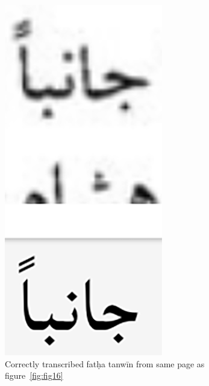 \begin{figure}[h]
	\includegraphics[width=\linewidth]{images/image1.png}
	\caption{Correctly transcribed fatḥa tanwīn from same page as figure~\ref{fig:fig16}}
  	\label{fig:fig17}
\end{figure}

